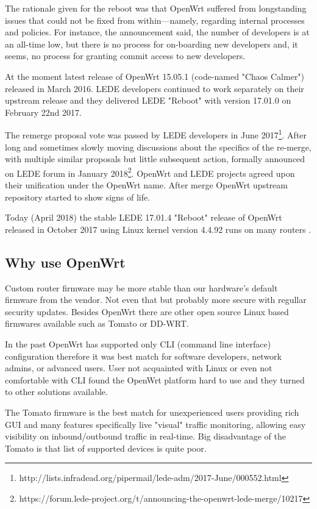The rationale given for the reboot was that OpenWrt suffered from longstanding issues that could not be fixed from within—namely, regarding internal processes and policies.
For instance, the announcement said, the number of developers is at an all-time low, but there is no process for on-boarding new developers and, it seems, no process for granting commit access to new developers.

At the moment latest release of OpenWrt 15.05.1 (code-named "Chaos Calmer") released in March 2016.
LEDE developers continued to work separately on their upstream release and they delivered LEDE "Reboot" with version 17.01.0 on February 22nd 2017.

The remerge proposal vote was passed by LEDE developers in June 2017\footnote{http://lists.infradead.org/pipermail/lede-adm/2017-June/000552.html}.
After long and sometimes slowly moving discussions about the specifics of the re-merge, with multiple similar proposals but little subsequent action, formally announced on LEDE forum in January 2018\footnote{https://forum.lede-project.org/t/announcing-the-openwrt-lede-merge/10217}.
OpenWrt and LEDE projects agreed upon their unification under the OpenWrt name.
After merge OpenWrt upstream repository started to show signs of life.

Today (April 2018) the stable LEDE 17.01.4 "Reboot" release of OpenWrt released in October 2017 using Linux kernel version 4.4.92 runs on many routers \cite{lede_release}.



\subsection{Why use OpenWrt}

Custom router firmware may be more stable than our hardware’s default firmware from the vendor.
Not even that but probably more secure with regullar security updates.
Besides OpenWrt there are other open source Linux based firmwares available such as Tomato or DD-WRT.

In the past OpenWrt has supported only CLI (command line interface) configuration therefore it was best match for software developers, network admins, or advanced users.
User not acquainted with Linux or even not comfortable with CLI found the OpenWrt platform hard to use and they turned to other solutions available.

The Tomato firmware is the best match for unexperienced users providing rich GUI and many features specifically live "visual" traffic monitoring, allowing easy visibility on inbound/outbound traffic in real-time.
Big disadvantage of the Tomato is that list of supported devices is quite poor.


